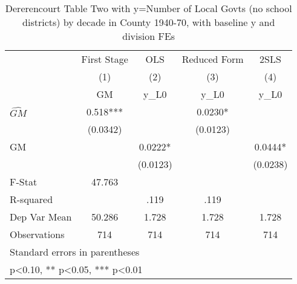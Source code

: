 \begin{table}[htbp]\centering
\def\sym#1{\ifmmode^{#1}\else\(^{#1}\)\fi}
\caption{Dererencourt Table Two with y=Number of Local Govts (no school districts) by decade in County 1940-70, with baseline y and division FEs}
\begin{tabular}{l*{4}{c}}
\toprule
                    & First Stage   &         OLS   &Reduced Form   &        2SLS   \\
                    &\multicolumn{1}{c}{(1)}&\multicolumn{1}{c}{(2)}&\multicolumn{1}{c}{(3)}&\multicolumn{1}{c}{(4)}\\
                    &\multicolumn{1}{c}{GM}&\multicolumn{1}{c}{y\_L0}&\multicolumn{1}{c}{y\_L0}&\multicolumn{1}{c}{y\_L0}\\
\midrule
$\hat{GM}$          &       0.518***&               &      0.0230*  &               \\
                    &    (0.0342)   &               &    (0.0123)   &               \\
\addlinespace
GM                  &               &      0.0222*  &               &      0.0444*  \\
                    &               &    (0.0123)   &               &    (0.0238)   \\
\midrule
F-Stat              &      47.763   &               &               &               \\
R-squared           &               &        .119   &        .119   &               \\
Dep Var Mean        &      50.286   &       1.728   &       1.728   &       1.728   \\
Observations        &         714   &         714   &         714   &         714   \\
\bottomrule
\multicolumn{5}{l}{\footnotesize Standard errors in parentheses}\\
\multicolumn{5}{l}{\footnotesize * p<0.10, ** p<0.05, *** p<0.01}\\
\end{tabular}
\end{table}
